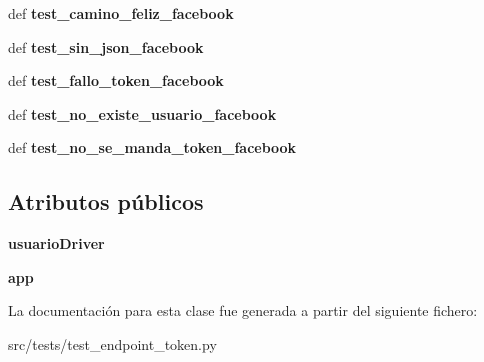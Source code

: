 \begin{DoxyCompactItemize}
\item 
\hypertarget{classsrc_1_1tests_1_1test__endpoint__token_1_1_test_endpoint_token_a3d7d056b816bca3ba3bc11457a846ce3}{def {\bfseries test\-\_\-camino\-\_\-feliz\-\_\-facebook}}\label{classsrc_1_1tests_1_1test__endpoint__token_1_1_test_endpoint_token_a3d7d056b816bca3ba3bc11457a846ce3}

\item 
\hypertarget{classsrc_1_1tests_1_1test__endpoint__token_1_1_test_endpoint_token_a32707321ca0d110a0b7a33b8418984e7}{def {\bfseries test\-\_\-sin\-\_\-json\-\_\-facebook}}\label{classsrc_1_1tests_1_1test__endpoint__token_1_1_test_endpoint_token_a32707321ca0d110a0b7a33b8418984e7}

\item 
\hypertarget{classsrc_1_1tests_1_1test__endpoint__token_1_1_test_endpoint_token_a41922b84253ed3c3ae730697830d8c6f}{def {\bfseries test\-\_\-fallo\-\_\-token\-\_\-facebook}}\label{classsrc_1_1tests_1_1test__endpoint__token_1_1_test_endpoint_token_a41922b84253ed3c3ae730697830d8c6f}

\item 
\hypertarget{classsrc_1_1tests_1_1test__endpoint__token_1_1_test_endpoint_token_a1aff086ab44b3e9f4269831ba648dd28}{def {\bfseries test\-\_\-no\-\_\-existe\-\_\-usuario\-\_\-facebook}}\label{classsrc_1_1tests_1_1test__endpoint__token_1_1_test_endpoint_token_a1aff086ab44b3e9f4269831ba648dd28}

\item 
\hypertarget{classsrc_1_1tests_1_1test__endpoint__token_1_1_test_endpoint_token_a2a9462e1a46c649f89caa5c66ae3a960}{def {\bfseries test\-\_\-no\-\_\-se\-\_\-manda\-\_\-token\-\_\-facebook}}\label{classsrc_1_1tests_1_1test__endpoint__token_1_1_test_endpoint_token_a2a9462e1a46c649f89caa5c66ae3a960}

\end{DoxyCompactItemize}
\subsection*{Atributos públicos}
\begin{DoxyCompactItemize}
\item 
\hypertarget{classsrc_1_1tests_1_1test__endpoint__token_1_1_test_endpoint_token_a69a267a1cf9d7ddb30c31aabf14ff2c7}{{\bfseries usuario\-Driver}}\label{classsrc_1_1tests_1_1test__endpoint__token_1_1_test_endpoint_token_a69a267a1cf9d7ddb30c31aabf14ff2c7}

\item 
\hypertarget{classsrc_1_1tests_1_1test__endpoint__token_1_1_test_endpoint_token_a35501d42c2a4197c00f7e3ccbf40ee64}{{\bfseries app}}\label{classsrc_1_1tests_1_1test__endpoint__token_1_1_test_endpoint_token_a35501d42c2a4197c00f7e3ccbf40ee64}

\end{DoxyCompactItemize}


La documentación para esta clase fue generada a partir del siguiente fichero\-:\begin{DoxyCompactItemize}
\item 
src/tests/test\-\_\-endpoint\-\_\-token.\-py\end{DoxyCompactItemize}
